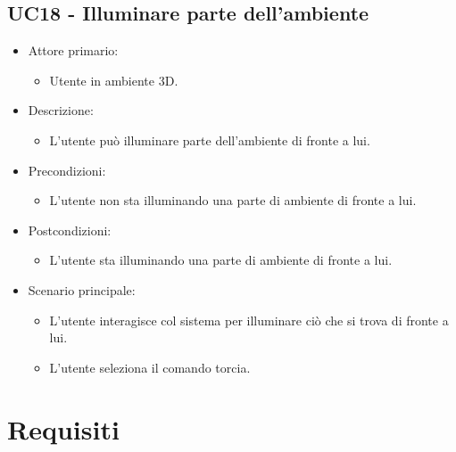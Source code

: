 \subsection{UC18 - Illuminare parte dell'ambiente}
\begin{itemize}

	\item Attore primario: 
	\begin{itemize}
		\item Utente in ambiente 3D.
	\end{itemize}
	\item Descrizione:
	\begin{itemize}
		\item L'utente può illuminare parte dell'ambiente di fronte a lui.
	\end{itemize}
	
	\item Precondizioni:
	\begin{itemize}
		\item L'utente non sta illuminando una parte di ambiente di fronte a lui.
	\end{itemize}
	
	\item Postcondizioni:
	\begin{itemize}
		\item L'utente sta illuminando una parte di ambiente di fronte a lui.
	\end{itemize}
	
	\item Scenario principale:
	\begin{itemize}
		\item L'utente interagisce col sistema per illuminare ciò che si trova di fronte a lui.
		\item L'utente seleziona il comando torcia.
	\end{itemize}
	
\end{itemize}

\pagebreak


\section{Requisiti}


